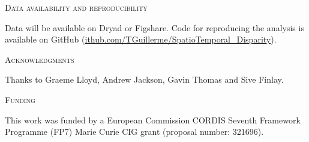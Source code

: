 \documentclass[12pt,letterpaper]{article}
\renewcommand{\section}[1]{%
\bigskip
\begin{center}
\begin{Large}
\normalfont\scshape #1
\medskip
\end{Large}
\end{center}}
\begin{document}

\section{Data availability and reproducibility}
Data will be available on Dryad or Figshare.
Code for reproducing the analysis is available on GitHub (\url{ithub.com/TGuillerme/SpatioTemporal_Disparity}).

\section{Acknowledgments}
Thanks to Graeme Lloyd, Andrew Jackson, Gavin Thomas and Sive Finlay.%

\section{Funding} %
This work was funded by a European Commission CORDIS Seventh Framework Programme (FP7) Marie Curie CIG grant (proposal number: 321696).





\end{document}
